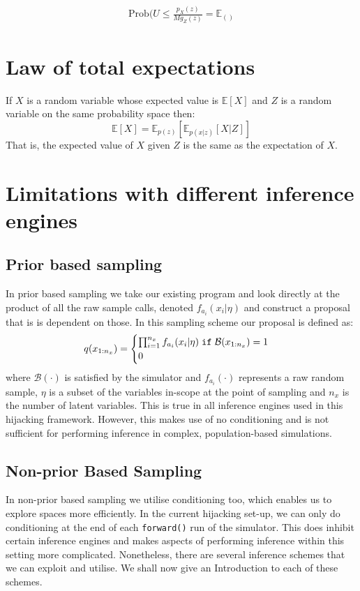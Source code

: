 \documentclass{article}
\begin{document}
\begin{align}
  \text{Prob}(U \leq \frac{p_{X}(z)}{Mg_{Z}(z)} = \mathbb{E}_()
\end{align}
\section{Law of total expectations}

If $X$ is a random variable whose expected value is $\mathbb{E}[X]$ and $Z$ is a random variable on the same probability space
then: \begin{equation}
  \label{eq:lawoftotalexp}
  \mathbb{E}[X] = \mathbb{E}_{p(z)}[\mathbb{E}_{p(x|z)}[X | Z]]
\end{equation}
That is, the expected value of $X$ given $Z$ is the same as the expectation of $X$.

\section{Limitations with different inference engines}  


\subsection{Prior based sampling}
In prior based sampling we take our existing program and look directly at the product of all the raw sample calls, denoted $f_{a_i}(x_i | \eta)$ and 
construct a proposal that is is dependent on those. In this sampling scheme our proposal is defined as:
\begin{equation}
  q(x_{1:n_{x}}) = 
  \begin{cases}
    \prod_{i=1}^{n_x} f_{a_i}(x_i | \eta) \hspace{0.1cm} \texttt{if} \hspace{0.1cm} \mathcal{B}(x_{1:n_{x}})=1 \\
    0
  \end{cases}
\end{equation}
where $\mathcal{B}(\cdot)$ is satisfied by the simulator and $f_{a_i}(\cdot)$ represents a
raw random sample, $\eta$ is a subset of the variables in-scope at the point of sampling
and $n_{x}$ is the number of latent variables.
 This is true in all inference engines used in this hijacking framework.
However, this makes use of no conditioning and is not sufficient for performing inference in
complex, population-based simulations.

\subsection{Non-prior Based Sampling}
In non-prior based sampling we utilise conditioning too, which enables 
us to explore spaces more efficiently. 
In the current hijacking set-up, we
can only do conditioning at the end of each \texttt{forward()} run of the simulator. 
This does inhibit certain inference engines and makes aspects of performing inference 
within this setting more complicated. 
Nonetheless, there are several inference schemes 
that we can exploit and utilise. 
We shall now give an Introduction to each of these schemes. 
\end{document}
